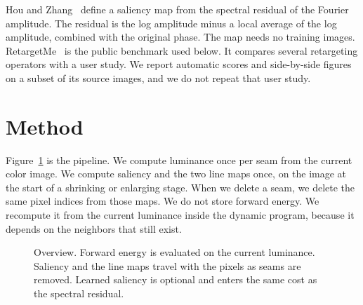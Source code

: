 \documentclass[10pt,twocolumn,letterpaper]{article}
\begin{document}
Hou and Zhang~\cite{hou2007saliency} define a saliency map from the spectral residual of the Fourier amplitude.
The residual is the log amplitude minus a local average of the log amplitude, combined with the original phase.
The map needs no training images.
RetargetMe~\cite{rubinstein2010comparative} is the public benchmark used below.
It compares several retargeting operators with a user study.
We report automatic scores and side-by-side figures on a subset of its source images, and we do not repeat that user study.

\section{Method}
\label{sec:method}

Figure~\ref{fig:overview} is the pipeline.
We compute luminance once per seam from the current color image.
We compute saliency and the two line maps once, on the image at the start of a shrinking or enlarging stage.
When we delete a seam, we delete the same pixel indices from those maps.
We do not store forward energy.
We recompute it from the current luminance inside the dynamic program, because it depends on the neighbors that still exist.

\begin{figure}[t]
\centering
{}
\caption{Overview. Forward energy is evaluated on the current luminance. Saliency and the line maps travel with the pixels as seams are removed. Learned saliency is optional and enters the same cost as the spectral residual.}
\label{fig:overview}
\end{figure}
\end{document}
